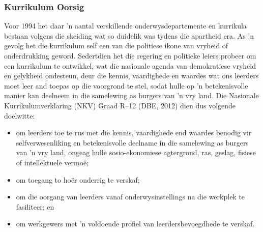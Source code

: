 \subsubsection{Kurrikulum Oorsig}
Voor 1994 het daar 'n aantal verskillende onderwysdepartemente en
kurrikula bestaan volgens die skeiding wat so duidelik was tydens die
apartheid era.
As 'n gevolg het die kurrikulum self een van die politiese ikone van
vryheid of onderdrukking geword.
Sedertdien het die regering en politieke leiers probeer om een
kurrikulum te ontwikkel, wat die nasionale agenda van demokratiese
vryheid en gelykheid ondesteun, deur die kennis, vaardighede en
waardes wat ons leerders moet leer and toepas op die voorgrond te
stel, sodat hulle op 'n betekenisvolle manier kan deelneem in die
samelewing as burgers van 'n vry land.
Die Nasionale Kurrikulumverklaring (NKV) Graad R--12 (DBE, 2012) dien
dus volgende doelwitte:
\begin{itemize}
\item
  om leerders toe te rus met die kennis, vaardighede end waardes
  benodig vir selfverwesenliking en betekenisvolle deelname in die
  samelewing as burgers van 'n vry land, ongeag hulle sosio-ekonomiese
  agtergrond, ras, geslag, fisiese of intellektuele vermo\"{e};
\item
  om toegang to ho\"{e}r onderrig te verskaf;
\item
  om die oorgang van leerders vanaf onderwysinstellings na die
  werkplek te fasiliteer; en
\item
  om werkgewers met 'n voldoende profiel van leerdersbevoegdhede te
  verskaf.
\end{itemize}
